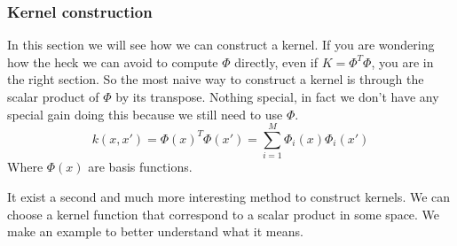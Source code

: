 \documentclass[main.tex]{subfiles}
\begin{document}
\subsubsection{Kernel construction}
In this section we will see how we can construct a kernel. If you are wondering how the heck we can avoid to compute $\Phi$ directly, even if $K=\Phi^T \Phi$, you are in the right section.
So the most naive way to construct a kernel is through the scalar product of $\Phi$ by its transpose. Nothing special, in fact we don't have any special gain doing this because we still need to use $\Phi$.
\begin{equation*}
    k(x,x') = \Phi(x)^T \Phi(x') = \sum_{i=1}^M \Phi_i(x) \Phi_i(x')
\end{equation*}
Where $\Phi(x)$ are basis functions.

It exist a second and much more interesting method to construct kernels. We can choose a kernel function that correspond to a scalar product in some space. We make an example to better understand what it means.
\end{document}

